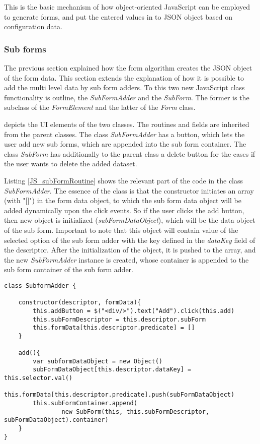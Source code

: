 This is the basic mechanism of how object-oriented JavaScript can be employed to generate forms, and put the entered values in to JSON object based on configuration data.


\subsubsection{Sub forms}


The previous section explained how the form algorithm creates the JSON object of the form data. This section extends the explanation of how it is possible to add the multi level data by sub form adders. To this two new JavaScript class functionality is outline, the \textit{SubFormAdder} and the \textit{SubForm}. The former is the subclass of the \textit{FormElement} and the latter of the \textit{Form} class. 



 depicts the UI elements of the two classes. The routines and fields are inherited from the parent classes. The class \textit{SubFormAdder} has a button, which lets the user add new sub forms, which are appended into the sub form container. The class \textit{SubForm} has additionally to the parent class a delete button for the cases if the user wants to delete the added dataset.  

Listing \ref{JS_subFormRoutine} shows the relevant part of the code in the class \textit{SubFormAdder}. The essence of the class is that the constructor initiates an array (with "[]") in the form data object, to which the sub form data object will be added dynamically upon the click events. So if the user clicks the add button, then new object is initialized (\textit{subFormDataObject}), which will be the data object of the sub form. Important to note that this object will contain value of the selected option of the sub form adder with the key defined in the \textit{dataKey} field of the descriptor. After the initialization of the object, it is pushed to the array, and the new \textit{SubFormAdder} instance is created, whose container is appended to the sub form container of the sub form adder. 


\begin{lstlisting}[basicstyle=\footnotesize, frame=single, caption={Sub form adder routine}, label=JS_subFormRoutine, captionpos=b, belowskip=1em, aboveskip=2em]
class SubformAdder {
	
	constructor(descriptor, formData){
		this.addButton = $("<div/>").text("Add").click(this.add)    
		this.subFormDescriptor = this.descriptor.subForm
		this.formData[this.descriptor.predicate] = []
	}

	add(){
		var subformDataObject = new Object()
		subFormDataObject[this.descriptor.dataKey] = this.selector.val()
		this.formData[this.descriptor.predicate].push(subFormDataObject) 
		this.subFormContainer.append(
				new SubForm(this, this.subFormDescriptor, subFormDataObject).container)
	}
}
\end{lstlisting}

